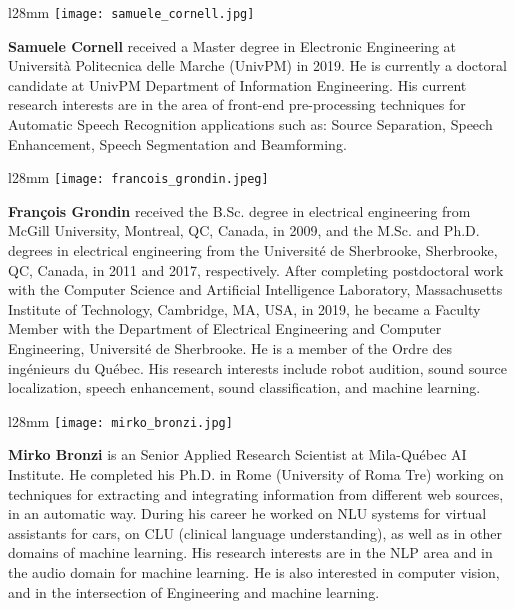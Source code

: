 \documentclass[lettersize,journal]{IEEEtran}
\begin{document}
\begin{wrapfigure}{l}{28mm} 
    \texttt{[image: samuele\_cornell.jpg]}
\end{wrapfigure}\par

\noindent\textbf{Samuele Cornell} received a Master degree in Electronic Engineering at Università Politecnica delle Marche (UnivPM) in 2019. He is currently a doctoral candidate at UnivPM Department of Information Engineering. His current research interests are in the area of front-end pre-processing techniques for Automatic Speech Recognition applications such as: Source Separation, Speech Enhancement, Speech Segmentation and Beamforming. \\

\begin{wrapfigure}{l}{28mm} 
    \texttt{[image: francois\_grondin.jpeg]}
\end{wrapfigure}\par

\noindent\textbf{François Grondin} received the B.Sc. degree in electrical engineering from McGill University, Montreal, QC, Canada, in 2009, and the M.Sc. and Ph.D. degrees in electrical engineering from the Université de Sherbrooke, Sherbrooke, QC, Canada, in 2011 and 2017, respectively. After completing postdoctoral work with the Computer Science and Artificial Intelligence Laboratory, Massachusetts Institute of Technology, Cambridge, MA, USA, in 2019, he became a Faculty Member with the Department of Electrical Engineering and Computer Engineering, Université de Sherbrooke. He is a member of the Ordre des ingénieurs du Québec. His research interests include robot audition, sound source localization, speech enhancement, sound classification, and machine learning. \\

\begin{wrapfigure}{l}{28mm} 
    \texttt{[image: mirko\_bronzi.jpg]}
\end{wrapfigure}\par

\noindent\textbf{Mirko Bronzi} is an Senior Applied Research Scientist at Mila-Québec AI Institute. He completed his Ph.D. in Rome (University of Roma Tre) working on techniques for extracting and integrating information from different web sources, in an automatic way. During his career he worked on NLU systems for virtual assistants for cars, on CLU (clinical language understanding), as well as in other domains of machine learning.
His research interests are in the NLP area and in the audio domain for machine learning. He is also interested in computer vision, and in the intersection of Engineering and machine learning.
\end{document}
